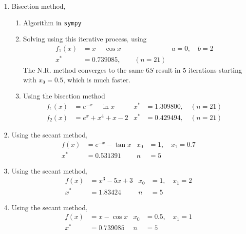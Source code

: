 \begin{enumerate}
    \item Bisection method,
          \begin{enumerate}
              \item Algorithm in \texttt{sympy}
              \item Solving using this iterative process, using
                    \begin{align}
                        f_1(x) & = x - \cos x              &
                        a = 0,\quad b = 2                    \\
                        x^*    & = 0.739085, \qquad (n=21)
                    \end{align}
                    The N.R. method converges to the same $ 6S $ result in
                    $ 5 $ iterations starting with $ x_0 = 0.5 $, which is much faster.

              \item Using the bisection method
                    \begin{align}
                        f_1(x) & = e^{-x} - \ln x           &
                        x^*    & = 1.309800, \quad (n = 21)   \\
                        f_2(x) & = e^{x} + x^4 + x - 2      &
                        x^*    & = 0.429494, \quad (n = 21)
                    \end{align}
          \end{enumerate}

    \item Using the secant method,
          \begin{align}
              f(x) & = e^{-x} - \tan x    &
              x_0  & = 1, \quad x_1 = 0.7   \\
              x^*  & = 0.531391           &
              n    & = 5
          \end{align}

    \item Using the secant method,
          \begin{align}
              f(x) & = x^3 - 5x + 3     &
              x_0  & = 1, \quad x_1 = 2   \\
              x^*  & = 1.83424          &
              n    & = 5
          \end{align}

    \item Using the secant method,
          \begin{align}
              f(x) & = x - \cos x         &
              x_0  & = 0.5, \quad x_1 = 1   \\
              x^*  & = 0.739085           &
              n    & = 5
          \end{align}


\end{enumerate}
